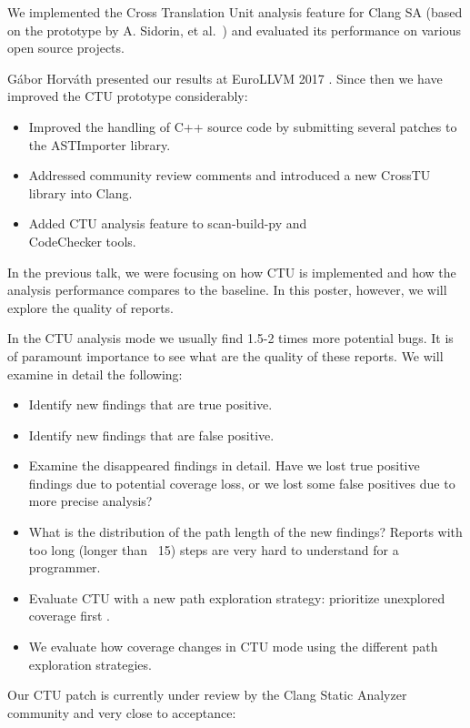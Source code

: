 \documentclass[sigconf]{acmart}
\begin{document}
We implemented the Cross Translation Unit analysis feature for Clang SA  
(based on the prototype by A. Sidorin, et al.~\cite{artemctu}) and evaluated 
its performance on various open source projects. 

G\'abor Horv\'ath presented our results at EuroLLVM 2017 \cite{eurollvm17}.
Since then we have improved the CTU prototype considerably: 
\begin{itemize}
\item Improved the handling of C++ source code by submitting several patches  
to the ASTImporter library.
\item Addressed community review comments and introduced a new CrossTU library into Clang.
\item Added CTU analysis feature to scan-build-py and\\ CodeChecker tools.
\end{itemize}

In the previous talk, we were focusing on how CTU is implemented and how the 
analysis performance compares to the baseline. In this poster, however, we will 
explore the quality of reports.

In the CTU analysis mode we usually find 1.5-2 times more potential bugs.
It is of paramount importance to see what are the quality of these reports.
We will examine in detail the following:
\begin{itemize}
\item Identify new findings that are true positive.
\item Identify new findings that are false positive.
\item Examine the disappeared findings in detail. Have we lost true positive findings
due to potential coverage loss, or we lost some false positives due 
to more precise analysis?
\item What is the distribution of the path length of the new findings? Reports
with too long (longer than ~15) steps are very hard to understand for a programmer.
\item Evaluate CTU with a new path exploration strategy: prioritize unexplored coverage first \cite{karpenkov}.
\item We evaluate how coverage changes in CTU mode using the different path exploration strategies.
\end{itemize}

Our CTU patch is currently under review by the Clang Static Analyzer community
and very close to acceptance: \cite{patch}
\end{document}
